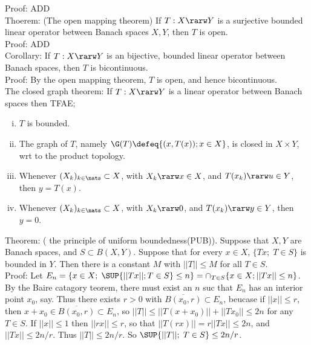 \noindent
Proof: ADD \\

Thoerem: (The open mapping theorem) If $T: X \rarw Y$ is a surjective bounded linear operator between Banach spaces $X,Y$, then $T$ is open.\\

\noindent
Proof: ADD \\

Corollary: If $T: X \rarw Y$ is an bijective, bounded linear operator between Banach spaces, then $T$ is bicontinuous.  \\

\noindent
Proof: By the open mapping theorem, $T$ is open, and hence bicontinuous. \\

The closed graph theorem: If $T: X \rarw Y$ is a linear operator between Banach spaces then TFAE;

\begin{enumerate}[i)]
\item
$T$ is bounded. 
\item
The graph of $T$, namely $\G(T) \defeq \{  (x, T(x)); x \in X \}$, is closed in $X \times Y$, wrt to the product topology.
\item
Whenever $(X_k)_{k \in \nats} \subset X$, with $X_k \rarw x \in X$, and $T(x_k) \rarw u \in Y$, then $y = T(x)$.
\item 
Whenever  $(X_k)_{k \in \nats} \subset X$, with $X_k \rarw 0$, and $T(x_k) \rarw y \in Y$, then $y=0$.
\end{enumerate}


Theorem: ( the principle of uniform boundedness(PUB)). Suppose that $X,Y$ are Banach spaces, and $S \subset B(X,Y)$. Suppose that for every $x \in X$, $\{ Tx; \; T \in S\}$ is bounded in $Y$. Then there is a constant $M$ with $||T|| \le M$ for all $T \in S$. \\

\noindent
Proof: Let $E_n = \{ x \in X; \;  \SUP{ ||Tx||; T \in S } \le n \} = \cap_{T \in S} \{ x \in X; ||Tx|| \le n \}$.  By the Baire catagory teorem, there must exist an $n$ suc that $E_n$ has an interior point $x_0$, say. Thus there exists $r >0$ with $\overline{ B(x_0, r) } \subset E_n$, beucase if $||x|| \le r$, then $x + x_0 \in \overline{ B(x_0, r) } \subset E_n$, so $||T|| \le ||T(x+x_0)|| + ||Tx_0|| \le 2n$ for any $T \in S$. If $||x|| \le 1$ then $||r x || \le r$, so that $||T(rx)|| = r ||Tx|| \le 2n$, and $||Tx|| \le 2n/r$. Thus $||T|| \le 2n/r$. So $ \SUP{ ||T||; \; T \in S } \le 2n/r$.  \\ 








